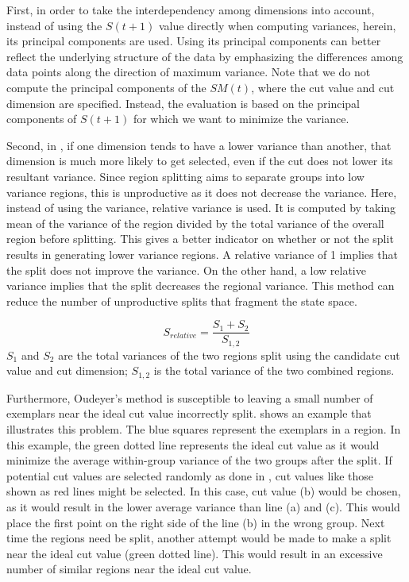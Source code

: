 First, in order to take the interdependency among dimensions into account, instead of using the $S(t+1)$ value directly when computing variances, herein, its principal components are used. Using its principal components can better reflect the underlying structure of the data by emphasizing the differences among data points along the direction of maximum variance. Note that we do not compute the principal components of the $SM(t)$, where the cut value and cut dimension are specified. Instead, the evaluation is based on the principal components of $S(t+1)$ for which we want to minimize the variance. 

Second, in \cite{Oudeyer2007}, if one dimension tends to have a lower variance than another, that dimension is much more likely to get selected, even if the cut does not lower its resultant variance. Since region splitting aims to separate groups into low variance regions, this is unproductive as it does not decrease the variance. Here, instead of using the variance, relative variance is used. It is computed by taking mean of the variance of the region divided by the total variance of the overall region before splitting. This gives a better indicator on whether or not the split results in generating lower variance regions. A relative variance of 1 implies that the split does not improve the variance. On the other hand, a low relative variance implies that the split decreases the regional variance. This method can reduce the number of unproductive splits that fragment the state space.

\begin{equation}
S_{relative} = \frac{S_1+S_2}{S_{1,2}}
\end{equation}
$S_1$ and $S_2$ are the total variances of the two regions split using the candidate cut value and cut dimension; $S_{1,2}$ is the total variance of the two combined regions.

Furthermore, Oudeyer's method is susceptible to leaving a small number of exemplars near the ideal cut value incorrectly split.  shows an example that illustrates this problem. The blue squares represent the exemplars in a region. In this example, the green dotted line represents the ideal cut value as it would minimize the average within-group variance of the two groups after the split. If potential cut values are selected randomly as done in \cite{Oudeyer2005}, cut values like those shown as red lines might be selected. In this case, cut value (b) would be chosen, as it would result in the lower average variance than line (a) and (c). This would place the first point on the right side of the line (b) in the wrong group. Next time the regions need be split, another attempt would be made to make a split near the ideal cut value (green dotted line). This would result in an excessive number of similar regions near the ideal cut value. 

